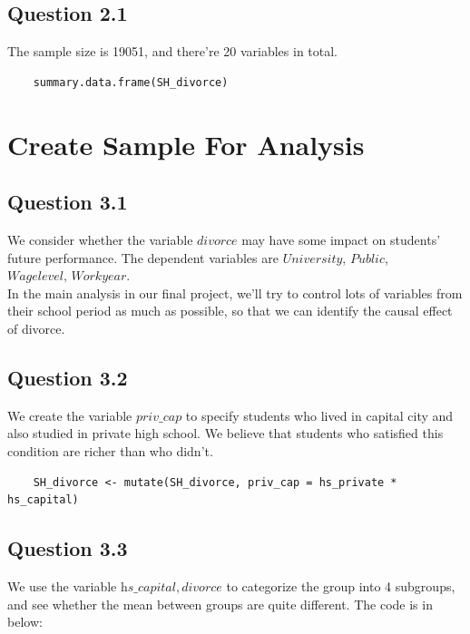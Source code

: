 \documentclass[11pt, letterpaper]{article}
\begin{document}
\subsection*{Question 2.1}

The sample size is 19051, and there're 20 variables in total.

\begin{lstlisting}
    summary.data.frame(SH_divorce)
\end{lstlisting}



\section{Create Sample For Analysis}


\subsection*{Question 3.1}

We consider whether the variable $\textit{divorce}$ may have some impact on students' future performance.
The dependent variables are $\textit{University, Public}$, \\
$\textit{Wagelevel, Workyear}$. \\

In the main analysis in our final project, we'll try to control lots of variables from their school period as much as possible, so that we can identify the causal effect of divorce.


\subsection*{Question 3.2}

We create the variable $\textit{priv}\_\textit{cap}$ to specify students who lived in capital city and also studied in private high school.
We believe that students who satisfied this condition are richer than who didn't.

\begin{lstlisting}
    SH_divorce <- mutate(SH_divorce, priv_cap = hs_private * hs_capital)
\end{lstlisting}


\subsection*{Question 3.3}

We use the variable $\textit{hs}\_\textit{capital}, \textit{divorce}$ to categorize the group into 4 subgroups, and see whether the mean between groups are quite different.
The code is in below:
\end{document}
